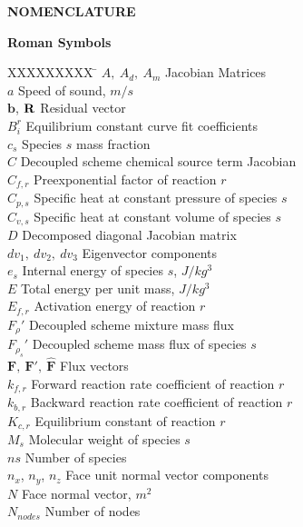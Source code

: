 \begin{center}
  \textbf{NOMENCLATURE}
\end{center}

\textbf{Roman Symbols}
\bigskip
\begin{tabbing}
  XXXXXXXXX \= \kill%
  $A,\ A_d,\ A_m$ \> Jacobian Matrices \\
  $a$ \> Speed of sound, $m/s$ \\
  $\mathbf{b}$, $\mathbf R_{}$ \> Residual vector \\
  $B^{r}_{i}$ \> Equilibrium constant curve fit coefficients \\
  $c_s$ \> Species $s$ mass fraction \\
  $C$ \> Decoupled scheme chemical source term Jacobian \\
  $C_{f,r}$ \> Preexponential factor of reaction $r$ \\
  $C_{p,s}$ \> Specific heat at constant pressure of species $s$ \\
  $C_{v,s}$ \> Specific heat at constant volume of species $s$ \\
  $D$ \> Decomposed diagonal Jacobian matrix \\
  $dv_1,\ dv_2,\ dv_3$ \> Eigenvector components \\
  $e_s$ \> Internal energy of species $s$, $J/kg^3$ \\
  $E$ \> Total energy per unit mass, $J/kg^3$ \\
  $E_{f,r}$ Activation energy of reaction $r$ \\
  $F_\rho'$\> Decoupled scheme mixture mass flux \\
  $F_{\rho_s}'$\> Decoupled scheme mass flux of species $s$ \\
  $\mathbf{F},\ \mathbf{F}',\ \mathbf{\hat{F}}$ \> Flux vectors \\
  $k_{f,r}$ \> Forward reaction rate coefficient of reaction $r$ \\
  $k_{b,r}$ \> Backward reaction rate coefficient of reaction $r$ \\
  $K_{c,r}$ \> Equilibrium constant of reaction $r$ \\
  $M_s$ \> Molecular weight of species $s$ \\
  $ns$ \> Number of species \\
  $n_x$, $n_y$, $n_z$ \> Face unit normal vector components \\
  $N$ \> Face normal vector, $m^2$ \\
  $N_{nodes}$ \> Number of nodes \\

\end{tabbing}
